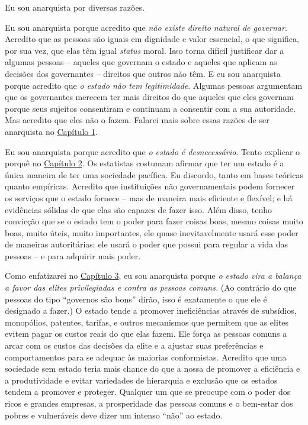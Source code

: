 Eu sou anarquista por diversas razões.

Eu sou anarquista porque acredito que \emph{não existe direito natural de governar}. Acredito que as pessoas são iguais em dignidade e valor essencial, o que significa, por sua vez, que elas têm igual \emph{status} moral. Isso torna difícil justificar dar a algumas pessoas -- aqueles que governam o estado e aqueles que aplicam as decisões dos governantes -- direitos que outros não têm. E eu sou anarquista porque acredito que \emph{o estado não tem legitimidade}. Algumas pessoas argumentam que os governantes merecem ter mais direitos do que aqueles que eles governam porque seus sujeitos consentiram e continuam a consentir com a sua autoridade. Mas acredito que eles não o fazem. Falarei mais sobre essas razões de ser anarquista no \hyperref[chap:1]{Capítulo 1}.

Eu sou anarquista porque acredito que \emph{o estado é desnecessário}. Tento explicar o porquê no \hyperref[chap:2]{Capítulo 2}. Os estatistas costumam afirmar que ter um estado é a única maneira de ter uma sociedade pacífica. Eu discordo, tanto em bases teóricas quanto empíricas. Acredito que instituições não governamentais podem fornecer os serviços que o estado fornece -- mas de maneira mais eficiente e flexível; e há evidências sólidas de que elas são capazes de fazer isso. Além disso, tenho convicção que se o estado tem o poder para fazer coisas boas, mesmo coisas muito boas, muito úteis, muito importantes, ele quase inevitavelmente usará esse poder de maneiras autoritárias: ele usará o poder que possui para regular a vida das pessoas -- e para adquirir mais poder.

Como enfatizarei no \hyperref[chap:3]{Capítulo 3}, eu sou anarquista porque \emph{o estado vira a balança a favor das elites privilegiadas e contra as pessoas comuns.} (Ao contrário do que pessoas do tipo ``governos são bons'' dirão, isso é exatamente o que ele é designado a fazer.) O estado tende a promover ineficiências através de subsídios, monopólios, patentes, tarifas, e outros mecanismos que permitem que as elites evitem pagar os custos reais do que elas fazem. Ele força as pessoas comuns a arcar com os custos das decisões da elite e a ajustar suas preferências e comportamentos para se adequar às maiorias conformistas. Acredito que uma sociedade sem estado teria mais chance do que a nossa de promover a eficiência e a produtividade e evitar variedades de hierarquia e exclusão que os estados tendem a promover e proteger. Qualquer um que se preocupe com o poder dos ricos e grandes empresas, a prosperidade das pessoas comuns e o bem-estar dos pobres e vulneráveis deve dizer um intenso ``não'' ao estado.

